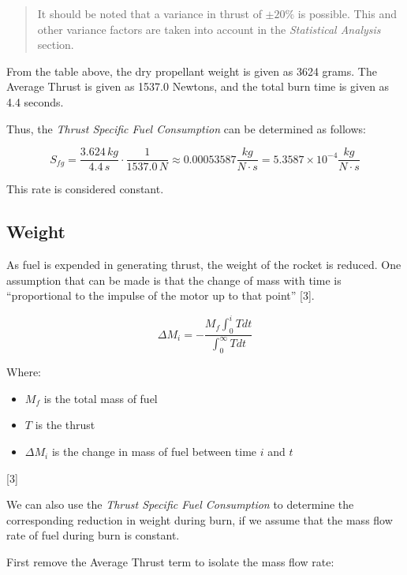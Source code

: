 \documentclass[]{book}
\providecommand{\tightlist}{%
  \setlength{\itemsep}{0pt}\setlength{\parskip}{0pt}}
\begin{document}
\begin{quote}
It should be noted that a variance in thrust of \(\pm 20 \%\) is
possible. This and other variance factors are taken into account in the
\emph{Statistical Analysis} section.
\end{quote}

From the table above, the dry propellant weight is given as 3624 grams.
The Average Thrust is given as 1537.0 Newtons, and the total burn time
is given as 4.4 seconds.

Thus, the \emph{Thrust Specific Fuel Consumption} can be determined as
follows:

\begin{equation}
S_{fg} = \dfrac{3.624 \, kg}{4.4 \, s} \cdot \dfrac{1}{1537.0 \, N} \approx 0.00053587 \dfrac{kg}{N \cdot s} = 5.3587 \times 10^{-4} \dfrac{kg}{N \cdot s} 
\end{equation}

This rate is considered constant.

\subsection{Weight}\label{weight}

As fuel is expended in generating thrust, the weight of the rocket is
reduced. One assumption that can be made is that the change of mass with
time is ``proportional to the impulse of the motor up to that point''
{[}3{]}.

\begin{equation}
\label{eq_mass_burned}
\Delta M_i = - \dfrac{M_f \int^i_0 T dt}{\int^\infty_0 T dt}
\end{equation}

Where:

\begin{itemize}
\tightlist
\item
  \(M_f\) is the total mass of fuel
\item
  \(T\) is the thrust
\item
  \(\Delta M_i\) is the change in mass of fuel between time \(i\) and
  \(t\)
\end{itemize}

{[}3{]}

We can also use the \emph{Thrust Specific Fuel Consumption} to determine
the corresponding reduction in weight during burn, if we assume that the
mass flow rate of fuel during burn is constant.

First remove the Average Thrust term to isolate the mass flow rate:
\end{document}
